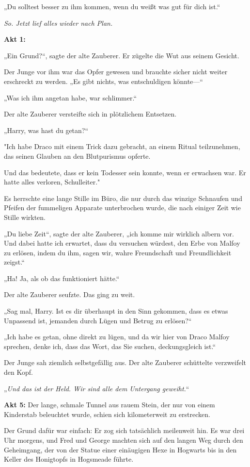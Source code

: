 {„Du solltest besser zu ihm kommen, wenn du weißt was gut für dich ist.“

\emph{So. Jetzt lief alles wieder nach Plan.}

\textbf{Akt 1:}

„Ein Grund?“, sagte der alte Zauberer. Er zügelte die Wut aus seinem Gesicht.

Der Junge vor ihm war das Opfer gewesen und brauchte sicher nicht weiter erschreckt zu werden. „Es gibt nichts, was entschuldigen könnte—“

„Was ich ihm angetan habe, war schlimmer.“

Der alte Zauberer versteifte sich in plötzlichem Entsetzen.

„Harry, was hast du getan?“

"Ich habe Draco mit einem Trick dazu gebracht, an einem Ritual teilzunehmen, das seinen Glauben an den Blutpurismus opferte.

Und das bedeutete, dass er kein Todesser sein konnte, wenn er erwachsen war. Er hatte alles verloren, Schulleiter."

Es herrschte eine lange Stille im Büro, die nur durch das winzige Schnaufen und Pfeifen der fummeligen Apparate unterbrochen wurde, die nach einiger Zeit wie Stille wirkten.

„Du liebe Zeit“, sagte der alte Zauberer, „ich komme mir wirklich albern vor. Und dabei hatte ich erwartet, dass du versuchen würdest, den Erbe von Malfoy zu erlösen, indem du ihm, sagen wir, wahre Freundschaft und Freundlichkeit zeigst.“

„Ha! Ja, als ob das funktioniert hätte.“

Der alte Zauberer seufzte. Das ging zu weit.

„Sag mal, Harry. Ist es dir überhaupt in den Sinn gekommen, dass es etwas Unpassend ist, jemanden durch Lügen und Betrug zu erlösen?“

„Ich habe es getan, ohne direkt zu lügen, und da wir hier von Draco Malfoy sprechen, denke ich, dass das Wort, das Sie suchen, deckungsgleich ist.“

Der Junge sah ziemlich selbstgefällig aus. Der alte Zauberer schüttelte verzweifelt den Kopf.

„\emph{Und das ist der Held. Wir sind alle dem Untergang geweiht.}“

\textbf{Akt 5:} Der lange, schmale Tunnel aus rauem Stein, der nur von einem Kinderstab beleuchtet wurde, schien sich kilometerweit zu erstrecken.

Der Grund dafür war einfach: Er zog sich tatsächlich meilenweit hin. Es war drei Uhr morgens, und Fred und George machten sich auf den langen Weg durch den Geheimgang, der von der Statue einer einäugigen Hexe in Hogwarts bis in den Keller des Honigtopfs in Hogsmeade führte.

}

